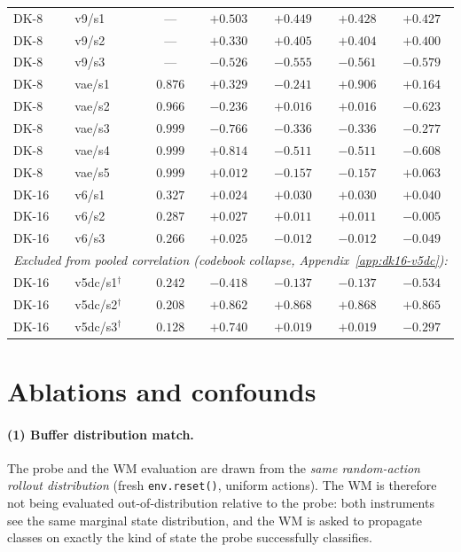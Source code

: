 \documentclass{article}
\begin{document}
\begin{table}[h]
\begin{tabular}{l l c c c c c}
    DK-8  & v9/s1   &  ---   & $+0.503$ & $+0.449$ & $+0.428$ & $+0.427$ \\
    DK-8  & v9/s2   &  ---   & $+0.330$ & $+0.405$ & $+0.404$ & $+0.400$ \\
    DK-8  & v9/s3   &  ---   & $-0.526$ & $-0.555$ & $-0.561$ & $-0.579$ \\
    DK-8  & vae/s1  & $0.876$ & $+0.329$ & $-0.241$ & $+0.906$ & $+0.164$ \\
    DK-8  & vae/s2  & $0.966$ & $-0.236$ & $+0.016$ & $+0.016$ & $-0.623$ \\
    DK-8  & vae/s3  & $0.999$ & $-0.766$ & $-0.336$ & $-0.336$ & $-0.277$ \\
    DK-8  & vae/s4  & $0.999$ & $+0.814$ & $-0.511$ & $-0.511$ & $-0.608$ \\
    DK-8  & vae/s5  & $0.999$ & $+0.012$ & $-0.157$ & $-0.157$ & $+0.063$ \\
    DK-16 & v6/s1   & $0.327$ & $+0.024$ & $+0.030$ & $+0.030$ & $+0.040$ \\
    DK-16 & v6/s2   & $0.287$ & $+0.027$ & $+0.011$ & $+0.011$ & $-0.005$ \\
    DK-16 & v6/s3   & $0.266$ & $+0.025$ & $-0.012$ & $-0.012$ & $-0.049$ \\
    \midrule
    \multicolumn{7}{l}{\emph{Excluded from pooled correlation (codebook collapse, Appendix~\ref{app:dk16-v5dc}):}} \\
    DK-16 & v5dc/s1$^\dagger$ & $0.242$ & $-0.418$ & $-0.137$ & $-0.137$ & $-0.534$ \\
    DK-16 & v5dc/s2$^\dagger$ & $0.208$ & $+0.862$ & $+0.868$ & $+0.868$ & $+0.865$ \\
    DK-16 & v5dc/s3$^\dagger$ & $0.128$ & $+0.740$ & $+0.019$ & $+0.019$ & $-0.297$ \\
    \bottomrule
  \end{tabular}
\end{table}

\section{Ablations and confounds}\label{app:ablations}

\paragraph{(1) Buffer distribution match.}
The probe and the WM evaluation are drawn from the \emph{same random-action rollout distribution} (fresh \texttt{env.reset()}, uniform actions). The WM is therefore not being evaluated out-of-distribution relative to the probe: both instruments see the same marginal state distribution, and the WM is asked to propagate classes on exactly the kind of state the probe successfully classifies.
\end{document}

